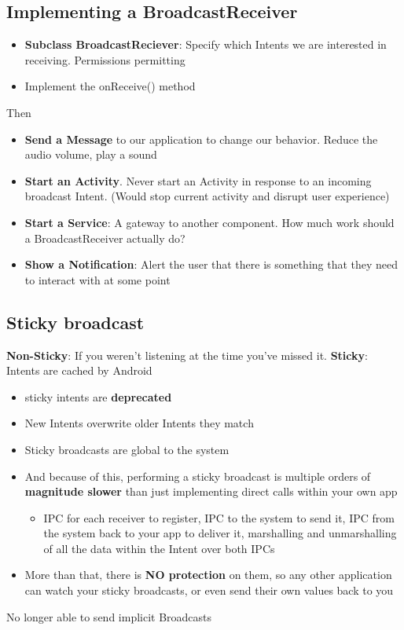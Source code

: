 \documentclass{article}
\begin{document}
\subsection{Implementing a BroadcastReceiver}

\begin{itemize}
  \item \textbf{Subclass BroadcastReciever}: Specify which Intents we are interested in receiving. Permissions permitting
  \item Implement the onReceive() method
\end{itemize}

\begin{flushleft}
Then
\begin{itemize}
  \item \textbf{Send a Message} to our application to change our behavior. Reduce the audio volume, play a sound 
  \item \textbf{Start an Activity}. Never start an Activity in response to an incoming broadcast Intent. (Would stop current activity and disrupt user experience) 
  \item \textbf{Start a Service}: A gateway to another component. How much work should a BroadcastReceiver actually do? 
  \item \textbf{Show a Notification}: Alert the user that there is something that they need to interact with at some point
\end{itemize}
\end{flushleft}

\subsection{Sticky broadcast}

\begin{flushleft}
\textbf{Non-Sticky}: If you weren’t listening at the time you’ve missed it.
\textbf{Sticky}: Intents are cached by Android
\begin{itemize}
  \item sticky intents are \textbf{deprecated}
  \item New Intents overwrite older Intents they match 
  \item Sticky broadcasts are global to the system 
  \item And because of this, performing a sticky broadcast is multiple orders of \textbf{magnitude slower} than just implementing direct calls within your own app 
  \begin{itemize}
    \item IPC for each receiver to register, IPC to the system to send it, IPC from the system back to your app to deliver it, marshalling and unmarshalling of all the data within the Intent over both IPCs 
  \end{itemize}
  \item More than that, there is \textbf{NO protection} on them, so any other application can watch your sticky broadcasts, or even send their own values back to you
\end{itemize}
No longer able to send implicit Broadcasts
\end{flushleft}
\end{document}
